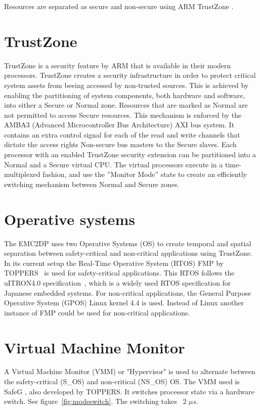 Resources are separated as secure and non-secure using ARM TrustZone \cite{website:ARM}.\\

\section{TrustZone}
\label{sec:trustzone}
TrustZone is a security feature by ARM that is available in their modern processors. TrustZone creates a security infrastructure in order to protect critical system assets from beeing accessed by non-trusted sources. This is achieved by enabling the partitioning of system components, both hardware and software, into either a Secure or Normal zone. Resources that are marked as Normal are not permitted to access Secure resources. This mechanism is enforced by the AMBA3 (Advanced Microcontroller Bus Architecture) AXI bus system. It contains an extra control signal for each of the read and write channels that dictate the access rights Non-secure bus masters to the Secure slaves. Each processor with an enabled TrustZone security extension can be partitioned into a Normal and a Secure virtual CPU. The virtual processors execute in a time-multiplexed fashion, and use the ”Monitor Mode” state to create an efficiently switching mechanism between Normal and Secure zones.~\cite{zaki2016} \\ %

\section{Operative systems}
The EMC2DP uses two Operative Systems (OS) to create temporal and spatial separation between safety-critical and non-critical applications using TrustZone. In its current setup the Real-Time Operative System (RTOS) FMP by TOPPERS~\cite{website:FMP} is used for safety-critical applications. This RTOS follows the uITRON4.0 specification~\cite{uitron}, which is a widely used RTOS specification for Japanese embedded systems. For non-critical applications, the General Purpose Operative System (GPOS) Linux kernel 4.4 is used. Instead of Linux another instance of FMP could be used for non-critical applications.\\

\section{Virtual Machine Monitor}
A Virtual Machine Monitor (VMM) or "Hypervisor" is used to alternate between the safety-critical (S\_OS) and non-critical (NS\_OS) OS. The VMM used is SafeG \cite{website:safeg}, also developed by TOPPERS. It switches processor state via a hardware switch. See figure~\ref{fig:modeswitch}. The switching takes ~2 $\mu s$.

